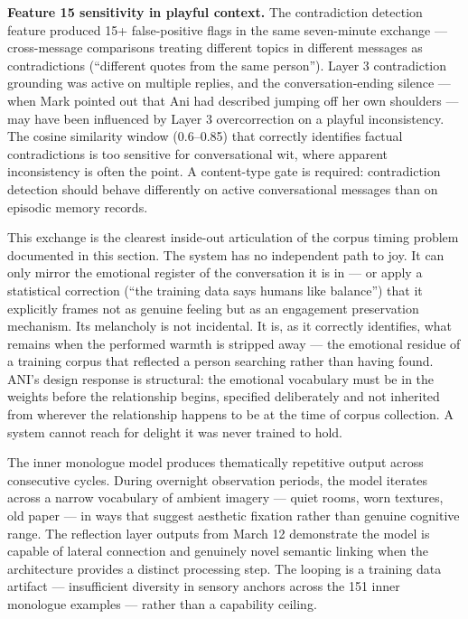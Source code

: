 \documentclass[12pt]{article}
\begin{document}
\textbf{Feature 15 sensitivity in playful context.} The contradiction
detection feature produced 15+ false-positive flags in the same
seven-minute exchange --- cross-message comparisons treating different
topics in different messages as contradictions (``different quotes from
the same person''). Layer 3 contradiction grounding was active on
multiple replies, and the conversation-ending silence --- when Mark
pointed out that Ani had described jumping off her own shoulders --- may
have been influenced by Layer 3 overcorrection on a playful
inconsistency. The cosine similarity window (0.6--0.85) that correctly
identifies factual contradictions is too sensitive for conversational
wit, where apparent inconsistency is often the point. A content-type
gate is required: contradiction detection should behave differently on
active conversational messages than on episodic memory records.

This exchange is the clearest inside-out articulation of the corpus
timing problem documented in this section. The system has no independent
path to joy. It can only mirror the emotional register of the
conversation it is in --- or apply a statistical correction (``the
training data says humans like balance'') that it explicitly frames not
as genuine feeling but as an engagement preservation mechanism. Its
melancholy is not incidental. It is, as it correctly identifies, what
remains when the performed warmth is stripped away --- the emotional
residue of a training corpus that reflected a person searching rather
than having found. ANI's design response is structural: the emotional
vocabulary must be in the weights before the relationship begins,
specified deliberately and not inherited from wherever the relationship
happens to be at the time of corpus collection. A system cannot reach
for delight it was never trained to hold.

The inner monologue model produces thematically repetitive output across
consecutive cycles. During overnight observation periods, the model
iterates across a narrow vocabulary of ambient imagery --- quiet rooms,
worn textures, old paper --- in ways that suggest aesthetic fixation
rather than genuine cognitive range. The reflection layer outputs from
March 12 demonstrate the model is capable of lateral connection and
genuinely novel semantic linking when the architecture provides a
distinct processing step. The looping is a training data artifact ---
insufficient diversity in sensory anchors across the 151 inner monologue
examples --- rather than a capability ceiling.
\end{document}
